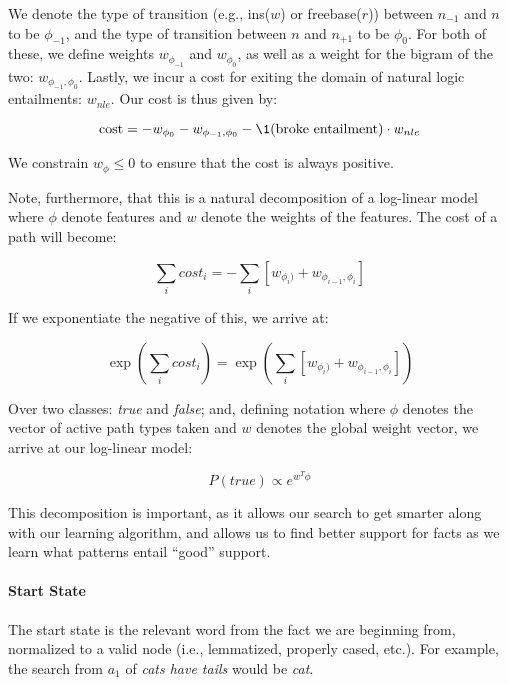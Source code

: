 \documentclass[11pt,a4paper]{article}
\def\w#1{\textit{#1}}
\begin{document}
We denote the type of transition 
  (e.g., ins($w$) or freebase($r$))
  between $n_{-1}$ and $n$ to be $\phi_{-1}$, and the
  type of transition between $n$ and $n_{+1}$ to
  be $\phi_0$.
For both of these, we define weights $w_{\phi_{-1}}$
  and $w_{\phi_0}$, as well as a weight for the
  bigram of the two: $w_{\phi_{-1}, \phi_0}$.
Lastly, we incur a cost for exiting the domain of natural
  logic entailments: $w_{nle}$.
Our cost is thus given by:

\begin{equation}
\textrm{cost} = - w_{\phi_{0}}
                - w_{\phi_{-1}, \phi_0}
                - \1(\textrm{broke entailment}) \cdot w_{nle}
\end{equation}

We constrain $w_{\phi} \leq 0$ to ensure that the
  cost is always positive. 

Note, furthermore, that this is a natural decomposition
  of a log-linear model where $\phi$ denote features
  and $w$ denote the weights of the features.
The cost of a path will become:

\begin{equation}
\sum_i cost_i = - \sum_i \left[ w_{\phi_i)} + w_{\phi_{i-1}, \phi_i}\right]
\end{equation}

If we exponentiate the negative of this, we arrive at:

\begin{equation}
\exp( \sum_i cost_i )
  = \exp\left( \sum_i \left[ w_{\phi_i)} + w_{\phi_{i-1}, \phi_i} \right] \right)
\end{equation}

Over two classes: \textit{true} and \textit{false};
  and, defining notation where $\phi$ denotes the
  vector of active path types taken and $w$ denotes
  the global weight vector, we arrive at our
  log-linear model:

\begin{equation}
P(\textit{true}) \propto e^{w^{T} \phi}
\end{equation}

This decomposition is important, as it allows our
  search to get smarter along with our learning
  algorithm, and allows us to find better support
  for facts as we learn what patterns entail
  ``good'' support.

\paragraph{Start State}
The start state is the relevant word from the fact
  we are beginning from, normalized to a valid node
  (i.e., lemmatized, properly cased, etc.).
For example, the search from $a_1$ of \w{cats have tails}
  would be \w{cat}.
\end{document}
